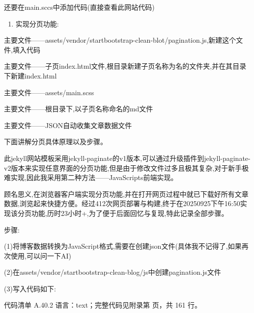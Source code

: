 \documentclass[lang=cn,scheme=chinese,color=blue,device=normal,toc=onecol,math=cm]{elegantbook}
\begin{document}
还要在main.sccs中添加代码(直接查看此网站代码)\par


\begin{enumerate}
\item 实现分页功能:
\end{enumerate}


主要文件——assets/\allowbreak{}vendor/\allowbreak{}startbootstrap-clean-blot/\allowbreak{}pagination.js,新建这个文件,填入代码\par


主要文件——子页index.html文件,根目录新建子页名称为名的文件夹,并在其目录下新建index.html\par


主要文件——assets/\allowbreak{}main.scss\par


主要文件——根目录下,以子页名称命名的md文件\par


主要文件——JSON自动收集文章数据文件\par


下面讲解分页具体原理以及步骤。\par


此jekyll网站模板采用jekyll-paginate的v1版本,可以通过升级插件到jekyll-paginate-v2版本来实现任意界面的分页功能,但是由于修改文件过多且极其复杂,对于新手极难实现,因此我采用第二种方法——JavaScripts前端实现。\par


顾名思义,在浏览器客户端实现分页功能,并在打开网页过程中就已下载好所有文章数据,浏览起来快捷方便。经过412次网页部署与构建,终于在20250925下午16:50实现该分页功能,历时23小时+,为了便于后面回忆与复现,特此记录全部步骤。\par


步骤:\par


(1)将博客数据转换为JavaScript格式,需要在创建json文件(具体我不记得了,如果再次使用,可以问一下AI)\par


(2)在assets/\allowbreak{}vendor/\allowbreak{}startbootstrap-clean-blog/\allowbreak{}js中创建pagination.js文件\par


(3)写入代码如下:\par


\begin{codeindexbox}{代码清单 A.40.2}
语言：text；完整代码见附录第 \pageref{code:40:2} 页，共 161 行。
\end{codeindexbox}
\end{document}
